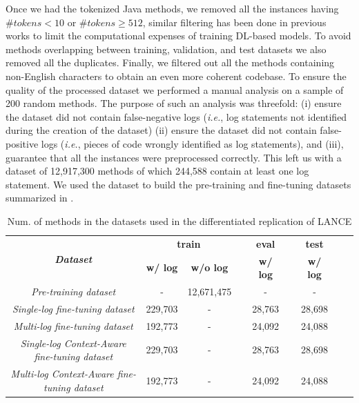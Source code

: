 Once we had the tokenized Java methods, we removed all the instances having $\#tokens < 10$ or $\#tokens \geq 512$, similar filtering has been done in previous works \cite{mastropaolo2021empirical,tufano2021automating,tufano2022using,ciniselli2021empirical, Tufano:tosem2019} to limit the computational expenses of training DL-based models.
To avoid methods overlapping between training, validation, and test datasets we also removed all the duplicates. 
Finally, we filtered out all the methods containing non-English characters to obtain an even more coherent codebase. 
To ensure the quality of the processed dataset we performed a manual analysis on a sample of 200 random methods. 
The purpose of such an analysis was threefold: (i) ensure  the dataset did not contain false-negative logs (\emph{i.e.}, log statements not identified during the creation of the dataset) (ii) ensure the dataset did not contain false-positive logs (\emph{i.e.}, pieces of code wrongly identified as log statements), and (iii), guarantee that all the instances were preprocessed correctly.
This left us with a dataset of 12,917,300 \java methods of which 244,588 contain at least one log statement. We used the dataset to build the pre-training and fine-tuning datasets summarized in . 

\begin{table}[h]
	\centering
	\caption{Num. of methods in the datasets used in the differentiated replication of LANCE}
		\label{tab:ds-summary-1}
	\begin{tabular}{ccccccccc}
		\hline
		\multirow{2}{*}{\textit{\textbf{Dataset}}} & \multicolumn{2}{c}{\textbf{train}} & \textbf{} & \textbf{eval} & \textbf{} & \textbf{test}  \\ \cline{2-3} \cline{5-5} \cline{7-7} 
		& \textbf{w/ log} & \textbf{w/o log} & \textbf{} & \textbf{w/ log} & \textbf{} & \textbf{w/ log} \\ \hline
		\textit{Pre-training dataset}              & -               &      12,671,475  &           & -               &           &  -               \\
		\textit{Single-log fine-tuning dataset}               & 229,703         & -                &           & 28,763          &           & 28,698          \\
		\textit{Multi-log fine-tuning dataset}               & 192,773         & -                &           & 24,092         &           & 24,088          \\ \hline
		\textit{Single-log Context-Aware fine-tuning dataset}               & 229,703         & -                &           & 28,763          &           & 28,698          \\
		\textit{Multi-log Context-Aware fine-tuning dataset}               & 192,773         & -                &           & 24,092         &           & 24,088          \\ \hline
	\end{tabular}
\end{table}



